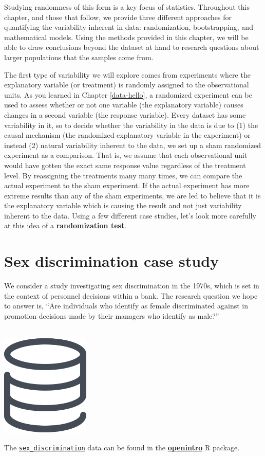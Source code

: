 \documentclass[
  10pt,
  openany]{book}
\newenvironment{mdframedwithfootTipDataPro}
{   
    \savenotes
    \begin{mdframed}[%
    topline=true, bottomline=true, linecolor=oiGray, linewidth=0.5pt,
    rightline=false, leftline=false,
    backgroundcolor=oiLGray]
    \renewcommand{\thempfootnote}{\arabic{footnote}}
    }
{
    \end{mdframed}
    \spewnotes
}
\newenvironment{data}{
\vspace{4mm}
\begin{mdframedwithfootTipDataPro}
\begin{minipage}[t]{0.10\textwidth}
{$\:$ \\ \setkeys{Gin}{width=2em,keepaspectratio}\includegraphics{images/_icons/data.png}}
\end{minipage}
\hfill
\begin{minipage}[t]{0.90\textwidth}
\vspace{-2mm}
\setlength{\parskip}{1em}
}{\end{minipage}
\end{mdframedwithfootTipDataPro}
\vspace{4mm}
}
\begin{document}
Studying randomness of this form is a key focus of statistics.
Throughout this chapter, and those that follow, we provide three different approaches for quantifying the variability inherent in data: randomization, bootstrapping, and mathematical models.
Using the methods provided in this chapter, we will be able to draw conclusions beyond the dataset at hand to research questions about larger populations that the samples come from.

The first type of variability we will explore comes from experiments where the explanatory variable (or treatment) is randomly assigned to the observational units.
As you learned in Chapter \ref{data-hello}, a randomized experiment can be used to assess whether or not one variable (the explanatory variable) causes changes in a second variable (the response variable).
Every dataset has some variability in it, so to decide whether the variability in the data is due to (1) the causal mechanism (the randomized explanatory variable in the experiment) or instead (2) natural variability inherent to the data, we set up a sham randomized experiment as a comparison.
That is, we assume that each observational unit would have gotten the exact same response value regardless of the treatment level.
By reassigning the treatments many many times, we can compare the actual experiment to the sham experiment.
If the actual experiment has more extreme results than any of the sham experiments, we are led to believe that it is the explanatory variable which is causing the result and not just variability inherent to the data.
Using a few different case studies, let's look more carefully at this idea of a \textbf{randomization test}.

\hypertarget{caseStudySexDiscrimination}{%
\section{Sex discrimination case study}\label{caseStudySexDiscrimination}}

We consider a study investigating sex discrimination in the 1970s, which is set in the context of personnel decisions within a bank. The research question we hope to answer is, ``Are individuals who identify as female discriminated against in promotion decisions made by their managers who identify as male?'' \citep{Rosen:1974}

\begin{data}
The \href{http://openintrostat.github.io/openintro/reference/sex_discrimination.html}{\texttt{sex\_discrimination}} data can be found in the \href{http://openintrostat.github.io/openintro}{\textbf{openintro}} R package.

\end{data}
\end{document}
